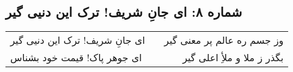 \begin{center}
\section*{شماره ۸: ای جانِ شریف! ترک این دنیی گیر}
\label{sec:008}
\begin{longtable}{l p{0.5cm} r}
ای جانِ شریف! ترک این دنیی گیر
&&
وز جسم ره عالم پر معنی گیر
\\
ای جوهر پاک! قیمت خود بشناس
&&
بگذر ز ملا و ملأِ اعلی گیر
\\
\end{longtable}
\end{center}
